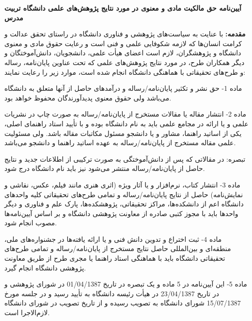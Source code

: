 %
%
%
%
%
%

\begin{center}
\textbf{%
آیین‌نامه حق مالکیت مادی و معنوی در مورد نتایج پژوهش‌های علمی دانشگاه تربیت مدرس%
}
\end{center}
\thispagestyle{empty}
\fontsize{3.4mm}{3.4mm}\selectfont 
\textbf{%
مقدمه:%
}
با عنایت به سیاست‌های پژوهشی و فناوری دانشگاه در راستای تحقق عدالت و کرامت انسان‌ها که لازمه شکوفایی علمی و فنی است و رعایت حقوق مادی و معنوی دانشگاه و پژوهشگران، لازم است اعضای هیأت علمی، دانشجویان، دانش‌آموختگان و دیگر همکاران طرح، در مورد نتایج پژوهش‌های علمی که تحت عناوین پایان‌نامه، رساله و طرح‌های تحقیقاتی با هماهنگی دانشگاه انجام شده است، موارد زیر را رعایت نمایند:

ماده 1- حق نشر و تکثیر پایان‌نامه/رساله و درآمدهای حاصل از آنها متعلق به دانشگاه می‌باشد ولی حقوق معنوی پدیدآورندگان محفوظ خواهد بود.

ماده 2- انتشار مقاله یا مقالات مستخرج از پایان‌نامه/رساله به صورت چاپ در نشریات علمی و یا ارائه در مجامع علمی باید به نام دانشگاه بوده و با تأیید استاد راهنمای اصلی، یکی از اساتید راهنما، مشاور و یا دانشجو مسئول مکاتبات مقاله باشد. ولی مسئولیت علمی مقاله مستخرج از پایان‌نامه/رساله به عهده اساتید راهنما و دانشجو می‌باشد. 

تبصره: در مقالاتی که پس از دانش‌آموختگی به صورت ترکیبی از اطلاعات جدید و نتایج حاصل از پایان‌نامه/رساله منتشر می‌شود نیز باید نام دانشگاه درج شود.

ماده 3- انتشار کتاب، نرم‌افزار و یا آثار ویژه (اثری هنری مانند فیلم، عکس، نقاشی و نمایش‌نامه) حاصل از نتایج پایان‌نامه/رساله و تمامی طرح‌های تحقیقاتی کلیه واحدهای دانشگاه اعم از دانشکده‌ها، مراکز تحقیقاتی، پژوهشکده‌ها، پارک علم و فناوری و دیگر واحدها باید با مجوز کتبی صادره از معاونت پژوهشی دانشگاه و بر اساس آیین‌نامه‌ها مصوب انجام شود.

ماده 4- ثبت اختراع و تدوین دانش فنی و یا ارائه یافته‌ها در جشنواره‌های ملی، منطقه‌ای و بین‌المللی حاصل نتایج مستخرج از پایان‌نامه/رساله و تمامی طرح‌های تحقیقاتی دانشگاه باید با هماهنگی استاد راهنما یا مجری طرح از طریق معاونت پژوهشی دانشگاه انجام گیرد.

ماده 5- این آیین‌نامه در 5 ماده و یک تبصره در تاریخ 01/04/1387 در شورای پژوهشی و در تاریخ 23/04/1387 در هیأت رئیسه دانشگاه به تأیید رسید و در جلسه مورخ 15/07/1387 شورای دانشگاه به تصویب رسیده و از تاریخ تصویب در شورای دانشگاه لازم‌الاجرا است.

